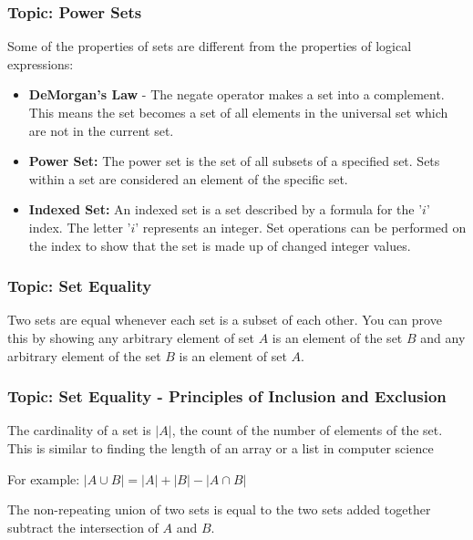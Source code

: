 \documentclass{article}
\begin{document}
\subsubsection{Topic: Power Sets}

Some of the properties of sets are different from the properties of logical expressions:

\begin{itemize}
  \item \textbf{DeMorgan’s Law} - The negate operator makes a set into a complement. This means the set becomes a set of all elements in the universal set which are not in the current set.

\noindent
\item \textbf{Power Set:} The power set is the set of all subsets of a specified set. Sets within a set are considered an element of the specific set.

\noindent
\item \textbf{Indexed Set:} An indexed set is a set described by a formula for the '$i$' index. The letter '$i$' represents an integer. Set operations can be performed on the index to show that the set is made up of changed integer values.
\end{itemize}
\subsubsection{Topic: Set Equality}

Two sets are equal whenever each set is a subset of each other. You can prove this by showing any arbitrary element of set $A$ is an element of the set $B$ and any arbitrary element of the set $B$ is an element of set $A$.

\subsubsection{Topic: Set Equality - Principles of Inclusion and Exclusion}

The cardinality of a set is $|A|$, the count of the number of elements of the set. This is similar to finding the length of an array or a list in computer science

For example: $|A \cup B| = |A| + |B| - |A \cap B|$

The non-repeating union of two sets is equal to the two sets added together subtract the intersection of $A$ and $B$.
\end{document}

